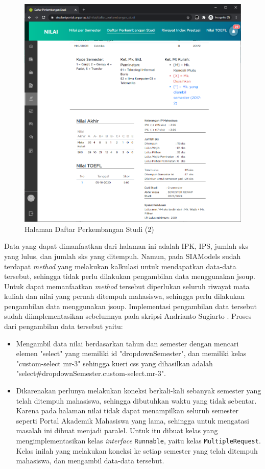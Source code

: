 \begin{itemize}
         \begin{figure}[H]
        	\centering
        	\includegraphics[scale=0.4]{Gambar/nilai_dps_2.png}
        	\caption{Halaman Daftar Perkembangan Studi (2)} 
        	\label{fig:3_dps_2}
        \end{figure}
        Data yang dapat dimanfaatkan dari halaman ini adalah IPK, IPS, jumlah sks yang lulus, dan jumlah sks yang ditempuh. Namun, pada SIAModels sudah terdapat \textit{method} yang melakukan kalkulasi untuk mendapatkan data-data tersebut, sehingga tidak perlu dilakukan pengambilan data menggunakan jsoup. Untuk dapat memanfaatkan \textit{method} tersebut diperlukan seluruh riwayat mata kuliah dan nilai yang pernah ditempuh mahasiswa, sehingga perlu dilakukan pengambilan data menggunakan jsoup.  Implementasi pengambilan data tersebut sudah diimplementasikan sebelumnya pada skripsi Andrianto Sugiarto \cite{ifstupor}. Proses dari pengambilan data tersebut yaitu:
        \begin{itemize}
            \item Mengambil data nilai berdasarkan tahun dan semester dengan mencari elemen "select" yang memiliki id "dropdownSemester", dan memiliki kelas "custom-select mr-3" sehingga kueri css yang dihasilkan adalah "select\#dropdownSemester.custom-select.mr-3".
            \item Dikarenakan perlunya melakukan koneksi berkali-kali sebanyak semester yang telah ditempuh mahasiswa, sehingga dibutuhkan waktu yang tidak sebentar. Karena pada halaman nilai tidak dapat menampilkan seluruh semester seperti Portal Akademik Mahasiswa yang lama, sehingga untuk mengatasi masalah ini dibuat menjadi paralel. Untuk itu dibuat kelas yang mengimplementasikan kelas \textit{interface} \texttt{Runnable}, yaitu kelas \texttt{MultipleRequest}. Kelas inilah yang melakukan koneksi ke setiap semester yang telah ditempuh mahasiswa, dan mengambil data-data tersebut.

\end{itemize}
\end{itemize}
